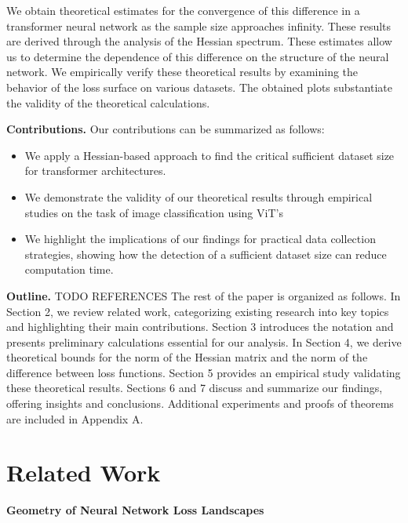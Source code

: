 \documentclass{article}
\begin{document}
We obtain theoretical estimates for the convergence of this difference in a transformer neural
network as the sample size approaches infinity. These results are derived through the analysis of the
Hessian spectrum. These estimates allow us to determine the dependence of this difference on the
structure of the neural network. We
empirically verify these theoretical results by examining the behavior of the loss surface on various
datasets. The obtained plots substantiate the validity of the theoretical calculations.

\textbf{Contributions.} Our contributions can be summarized as follows:
\begin{itemize}
    \item We apply a Hessian-based approach to
        find the critical sufficient dataset size for transformer architectures.
    \item We demonstrate the validity of our theoretical results through empirical studies on the task of image classification using ViT's
    \item We highlight the implications of our findings for practical data collection strategies, showing how the detection of
        a sufficient dataset size can reduce computation time.
\end{itemize}

\textbf{Outline.} TODO REFERENCES The rest of the paper is organized as follows. In Section 2, we review related work, categorizing existing research into key topics and highlighting their main contributions. Section 3 introduces the notation and presents preliminary calculations essential for our analysis. In Section 4, we derive theoretical bounds for the norm of the Hessian matrix and the norm of the difference between loss functions. Section 5 provides an empirical study validating these theoretical results. Sections 6 and 7 discuss and summarize our findings, offering insights and conclusions. Additional experiments and proofs of theorems are included in Appendix A.

\section{Related Work}\label{sec:rw}

\textbf{Geometry of Neural Network Loss Landscapes}
\end{document}
